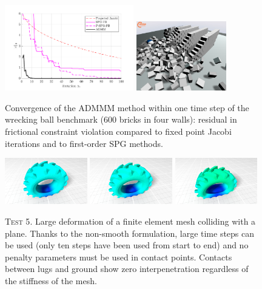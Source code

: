 \documentclass{svproc}
\begin{document}
\begin{figure}[!tbp]
\centering
\includegraphics[width=0.50\textwidth]{t8_convergence.pdf}
\includegraphics[width=0.35\textwidth, trim=0cm -3cm 0 3cm]{t8_snapshot.png}
\caption{Convergence of the ADMMM method within one time step of the wrecking ball benchmark (600 bricks in four walls): residual in frictional constraint violation compared to fixed point Jacobi iterations and to first-order SPG methods.}
\label{fig:t8}
\end{figure}


\begin{figure}[!tbp]
  \centering
	\includegraphics[width=0.32\textwidth]{tire_5.png}
  \includegraphics[width=0.32\textwidth]{tire_10.png}
	\includegraphics[width=0.32\textwidth]{tire_20.png}
	\hfill
  \caption{\textsc{Test 5}. Large deformation of a finite element mesh colliding with a plane. Thanks to the non-smooth formulation, large time steps can be used (only ten steps have been used from start to end) and no penalty parameters must be used in contact points. Contacts between lugs and ground show zero interpenetration regardless of the stiffness of the mesh.}
	\label{fig:tire}
\end{figure}
\end{document}
